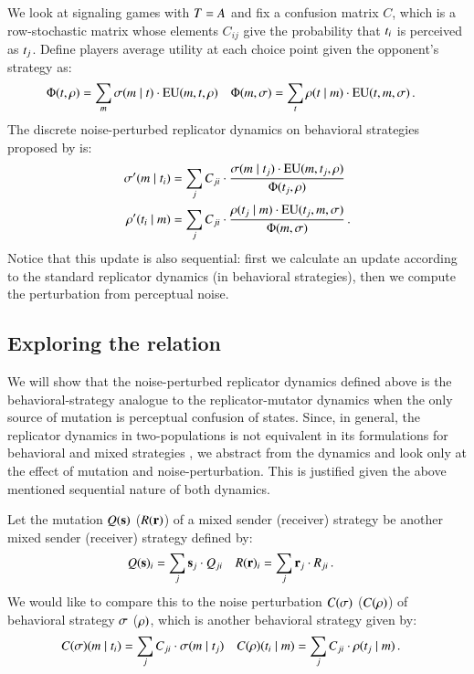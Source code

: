 We look at signaling games with $T = A$ and fix a confusion
matrix $C$, which is a row-stochastic matrix whose elements $C_{ij}$
give the probability that $t_i$ is perceived as
$t_j$. Define players average utility at each choice point given
the opponent's strategy as:
\begin{align*}
  \Phi(t,\rho) & = \sum_{m} \sigma(m \mid t) \cdot
\mathrm{EU}(m,t,\rho) &
\Phi(m,\sigma) & = \sum_{t} \rho(t \mid m)
\cdot \mathrm{EU}(t,m,\sigma)\,.
\end{align*}
The discrete noise-perturbed replicator dynamics on behavioral
strategies proposed by \citet{Correia2013:The-Bivalent-Tr} is:
\begin{align*}
  \sigma'(m \mid t_i) & = \sum_{j} C_{ji} \cdot
  \frac{\sigma(m \mid t_j) \cdot
    \mathrm{EU}(m,t_j,\rho)} {\Phi(t_j,\rho)} \\
    \rho'(t_i \mid m) & = \sum_{j} C_{ji} \cdot
  \frac{\rho(t_j \mid m) \cdot
    \mathrm{EU}(t_j,m,\sigma)} {\Phi(m,\sigma)}  \,.
\end{align*}
Notice that this update is also sequential: first we calculate an
update according to the standard replicator dynamics (in behavioral
strategies), then we compute the perturbation from perceptual noise.


\subsection{Exploring the relation}

We will show that the noise-perturbed replicator dynamics defined
above is the behavioral-strategy analogue to the replicator-mutator
dynamics when the only source of mutation is perceptual confusion of
states. Since, in general, the replicator dynamics in two-populations
is not equivalent in its formulations for behavioral and mixed
strategies \citep{Cressman2003:Evolutionary-Dy}, we abstract from the
dynamics and look only at the effect of mutation and
noise-perturbation. This is justified given the above mentioned
sequential nature of both dynamics.

Let the mutation $Q(\mathrm{\mathbf{s}})$ ($R(\mathrm{\mathbf{r}})$) of a mixed sender
(receiver) strategy be another mixed sender (receiver) strategy
defined by:
\begin{align*}
  Q(\mathrm{\mathbf{s}})_i & =  \sum_j  \mathrm{\mathbf{s}}_j \cdot
  Q_{ji} &   R(\mathrm{\mathbf{r}})_i & =  \sum_{j}  \mathrm{\mathbf{r}}_j \cdot
  R_{ji} \,.
\end{align*}
We would like to compare this to the noise perturbation $C(\sigma)$
($C(\rho)$) of behavioral strategy $\sigma$ ($\rho)$, which is
another behavioral strategy given by:
\begin{align*}
  C(\sigma)(m \mid t_i) & = \sum_{j} C_{ji} \cdot
  \sigma(m \mid t_j) & C(\rho)(t_i \mid
  m) & = \sum_{j} C_{ji} \cdot \rho(t_j \mid m)
  \,.
\end{align*}

